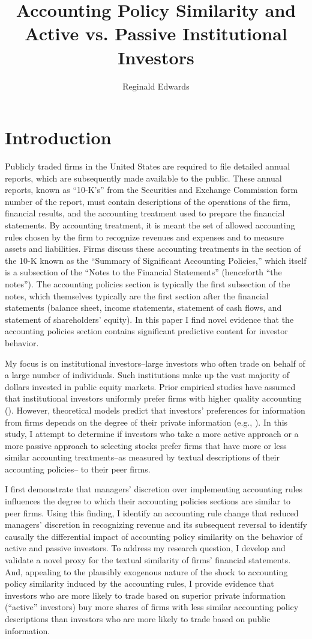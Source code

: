 \documentclass[thesis]{thesis-umich}
\title{Accounting Policy Similarity and Active vs. Passive Institutional Investors}
\author{Reginald Edwards}
\begin{document}
 


\chapter{Introduction}\label{chap:introduction} 
Publicly traded firms in the United States are required to file detailed annual reports, which are subsequently made available to the public. These annual reports, known as ``10-K's'' from the Securities and Exchange Commission form number of the report, must contain descriptions of the operations of the firm, financial results, and the accounting treatment used to prepare the financial statements. By accounting treatment, it is meant the set of allowed accounting rules chosen by the firm to recognize revenues and expenses and to measure assets and liabilities. Firms discuss these accounting treatments in the section of the 10-K known as the ``Summary of Significant Accounting Policies,''  which itself is a subsection of the ``Notes to the Financial Statements'' (henceforth ``the notes''). The accounting policies section is typically the first subsection of the notes, which themselves typically are the first section after the financial statements (balance sheet, income statements, statement of cash flows, and statement of shareholders' equity). In this paper I find novel evidence that the accounting policies section contains significant predictive content for investor behavior.

My focus is on institutional investors--large investors who often trade on behalf of a large number of individuals. Such institutions make up the vast majority of dollars invested in public equity markets. Prior empirical studies have assumed that institutional investors uniformly prefer firms with higher quality accounting (\cite{defondetal2011, fangetal2015, kimetal2016}). However, theoretical models predict that investors' preferences for information from firms depends on the degree of their private information (e.g., \cite{easleyohara2004}). In this study, I attempt to determine if investors who take a more active approach or a more passive approach to selecting stocks prefer firms that have more or less similar accounting treatments--as measured by textual descriptions of their accounting policies-- to their peer firms.

I first demonstrate that managers' discretion over implementing accounting rules influences the degree to which their accounting policies sections are similar to peer firms. Using this finding, I identify an accounting rule change that reduced managers' discretion in recognizing revenue and its subsequent reversal  to identify causally the differential impact of accounting policy similarity on the behavior of active and passive investors. To address my research question, I develop and validate a novel proxy for the textual similarity of firms' financial statements.  And, appealing to the plausibly exogenous nature of the shock to accounting policy similarity induced by the accounting rules,  I provide evidence that investors who are more likely to trade based on superior private information (``active'' investors) buy more shares of firms with less similar accounting policy descriptions than investors who are more likely to trade based on public information.
\end{document}
